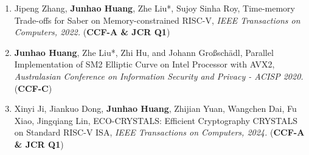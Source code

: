 \documentclass[letterpaper,11pt]{article}
\newlength{\outerbordwidth}
\newcommand{\resitem}[1]{\item #1 \vspace{-2pt}}
\newcommand{\resheading}[1]{\vspace{-5pt}%
  \parbox{\textwidth}{\setlength{\FrameSep}{\outerbordwidth}
    \begin{shaded}
\setlength{\fboxsep}{0pt}\framebox[\textwidth][l]{\setlength{\fboxsep}{4pt}\fcolorbox{shadecolorB}{shadecolorB}{\textbf{\sffamily{\mbox{~}\makebox[6.762in][l]{\large #1} \vphantom{p\^{E}}}}}}
    \end{shaded}
  }\vspace{-10pt}%
}
\begin{document}
\begin{enumerate}
{	}
	\item {Jipeng Zhang, \textbf{Junhao Huang}, Zhe Liu*, Sujoy Sinha Roy, Time-memory Trade-offs for Saber on Memory-constrained RISC-V, \textit{IEEE Transactions on Computers, 2022.} (\textbf{CCF-A \& JCR Q1})
	}
	\item {\textbf{Junhao Huang}, Zhe Liu*, Zhi Hu, and Johann Großschädl, Parallel Implementation of SM2 Elliptic Curve on Intel Processor with AVX2, \textit{Australasian Conference on Information Security and Privacy - ACISP 2020.} (\textbf{CCF-C})
	}
	\item {Xinyi Ji, Jiankuo Dong, \textbf{Junhao Huang}, Zhijian Yuan, Wangchen Dai, Fu Xiao, Jingqiang Lin, ECO-CRYSTALS: Efficient Cryptography CRYSTALS on Standard RISC-V ISA, \textit{IEEE Transactions on Computers, 2024.} (\textbf{CCF-A \& JCR Q1})
	}
\end{enumerate}

\end{document}
